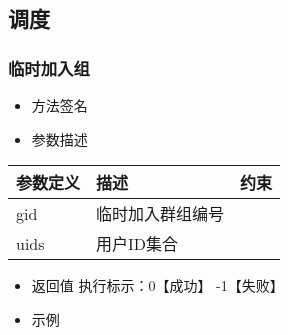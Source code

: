\documentclass[letterpaper,10pt,english]{sphinxmanual}
\begin{document}
\subsection{调度}
\label{\detokenize{csharp:id68}}

\subsubsection{临时加入组}
\label{\detokenize{csharp:id69}}\begin{itemize}
\item {} 
方法签名

\end{itemize}

%
\begin{sphinxVerbatim}[commandchars=\\\{\}]
    \PYG{p}{[}\PYG{p}{]} 
\end{sphinxVerbatim}
\begin{itemize}
\item {} 
参数描述

\end{itemize}


\begin{savenotes}\sphinxattablestart
\centering
\begin{tabulary}{\linewidth}[t]{|T|T|T|}
\hline
\sphinxstyletheadfamily 
参数定义
&\sphinxstyletheadfamily 
描述
&\sphinxstyletheadfamily 
约束
\\
\hline
gid
&
临时加入群组编号
&
\textendash{}
\\
\hline
uids
&
用户ID集合
&
\textendash{}
\\
\hline
\end{tabulary}
\par
\sphinxattableend\end{savenotes}
\begin{itemize}
\item {} 
返回值 执行标示：0【成功】 -1【失败】

\item {} 
示例

\end{itemize}

%
\begin{sphinxVerbatim}[commandchars=\\\{\}]
   
   \PYG{p}{[}\PYG{p}{]}   
 
\end{sphinxVerbatim}
\end{document}
